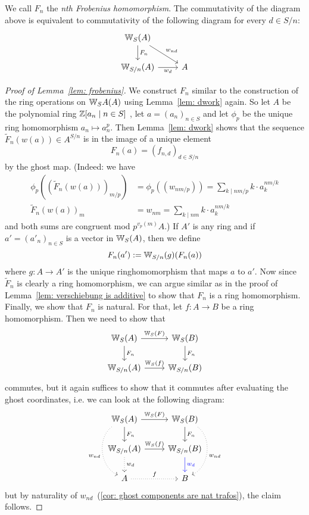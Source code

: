     We call $F_n$ the \textit{nth Frobenius homomorphism}.
    The commutativity of the diagram above is equivalent to
    commutativity of the following diagram for every $d \in S/n$:
    \[
        \begin{tikzcd}
            \W_S(A) \arrow[d,"F_n"] \arrow[dr,"w_{nd}"] \\
            \W_{S/n}(A) \arrow[r,"w_d"'] 
            & A
        \end{tikzcd}
    \]

\begin{proof}[Proof of Lemma~\ref*{lem: frobenius}]
    We construct $F_n$ similar to the construction of the ring operations on $\mathbb{W}_SA(A)$ 
    using Lemma~\ref{lem: dwork} again. So let $A$ be the polynomial ring $\mathbb{Z}[a_n\mid n \in S]$
    , let $a = (a_n)_{n \in S}$ and let $\phi_p$ be the unique ring homomorphism
    $a_n \mapsto a_n^p$. Then Lemma~\ref{lem: dwork} shows that the sequence
    $\widetilde{F}_n(w(a)) \in A^{S/n}$ is in the image of a unique element
    \[
      F_n(a)  =(f_{n,d})_{d \in S/n}
    \]
    by the ghost map. (Indeed: we have 
    \begin{align*}
        \phi_{p}((\widetilde{F}_n(w(a)))_{m/p}) &= \phi_{p}((w_{nm/p})) 
        = \sum_{k \mid nm/p} k \cdot a_k^{nm/k} \\
        \widetilde{F}_n(w(a))_m
        &= w_{nm}
        = \sum_{k \mid nm} k \cdot a_k^{nm/k}
    \end{align*}
    and both sums are congruent mod $p^{v_p(m)}A$.)
    If $A'$ is any ring and if $a' = (a'_n)_{n \in S}$ is a vector in $\mathbb{W}_S(A)$,
    then we define
    \[
      F_n(a') := \mathbb{W}_{S/n}(g)(F_n(a))  
    \]
    where $g \colon A \to A'$ is the unique ringhomomorphism that maps $a$ to $a'$.
    Now since $\widetilde{F}_n$ is clearly a ring homomorphism,
    we can argue similar as in the proof of Lemma~\ref{lem: verschiebung is additive}
    to show that $F_n$ is a ring homomorphism. Finally, we show that $F_n$ is natural.
    For that, let $f \colon A \to B$ be a ring homomorphism. Then we need to show that
    \[
        \begin{tikzcd}
            \W_S(A) \arrow[r,"\W_S(F)"] \arrow[d,"F_n"] 
              & \W_S(B) \arrow[d,"F_n"] \\
            \W_{S/n}(A) \arrow[r,"\W_S(f)"]
              & \W_{S/n}(B)
        \end{tikzcd}
    \]
    commutes, but it again suffices to show  that it commutes after
    evaluating the ghost coordinates, i.e. we can look at the following diagram:
    \[
        \begin{tikzcd}
            \W_S(A) \arrow[r,"\W_S(F)"] \arrow[d,"F_n"] \ar[dd,"w_{nd}"',dotted,bend right = 60]
              & \W_S(B) \arrow[d,"F_n"] \ar[dd,"w_{nd}",dotted,bend left = 60]\\
            \W_{S/n}(A) \arrow[r,"\W_S(f)"] \ar[d,"w_d",dotted]
              & \W_{S/n}(B) \ar[d,"w_d",blue] \\
              A \ar[r,"f",dotted] 
              & B
        \end{tikzcd}  
    \]
    but by naturality of $w_{nd}$~(\ref{cor: ghost components are nat trafos}), the claim follows.
\end{proof}
